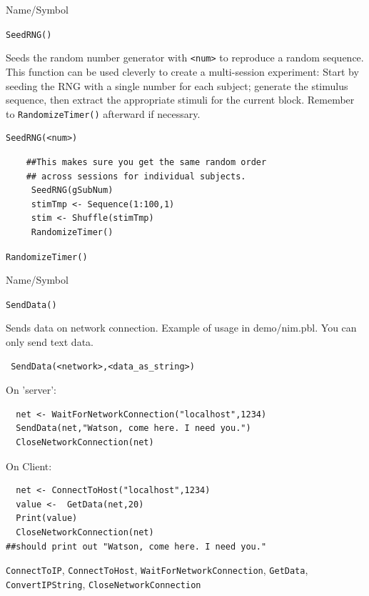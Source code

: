 \begin{desc}{Name/Symbol}
\item[Name/Symbol]   \verb+SeedRNG()+

\item[Description] Seeds the random number generator with \verb+<num>+
  to reproduce a random sequence.  This function can be used cleverly
  to create a multi-session experiment: Start by seeding the RNG with
  a single number for each subject; generate the stimulus sequence,
  then extract the appropriate stimuli for the current block. Remember
  to \verb+RandomizeTimer()+ afterward if necessary.

\item[Usage] 
\begin{verbatim}
SeedRNG(<num>) 
\end{verbatim}

\item[Example]	

\begin{verbatim}
    ##This makes sure you get the same random order 
    ## across sessions for individual subjects.
     SeedRNG(gSubNum)
     stimTmp <- Sequence(1:100,1)
     stim <- Shuffle(stimTmp)
     RandomizeTimer()
\end{verbatim}

\item[See Also]	
     \verb+RandomizeTimer()+
\end{desc}
\begin{desc}{Name/Symbol}
\item[Name/Symbol]	\verb+SendData()+

\item[Description]	Sends data on network connection.  Example of
  usage in demo/nim.pbl. You can only send text data.

\item[Usage]
\begin{verbatim}
 SendData(<network>,<data_as_string>)
\end{verbatim}

\item[Example]	

On 'server':
\begin{verbatim}
  net <- WaitForNetworkConnection("localhost",1234)
  SendData(net,"Watson, come here. I need you.")
  CloseNetworkConnection(net)
\end{verbatim}
On Client:
\begin{verbatim}
  net <- ConnectToHost("localhost",1234)
  value <-  GetData(net,20)
  Print(value)
  CloseNetworkConnection(net)
##should print out "Watson, come here. I need you."
\end{verbatim}
\item[See Also]
  \verb+ConnectToIP+, \verb+ConnectToHost+, \verb+WaitForNetworkConnection+, \verb+GetData+, \verb+ConvertIPString+, \verb+CloseNetworkConnection+
\end{desc}

